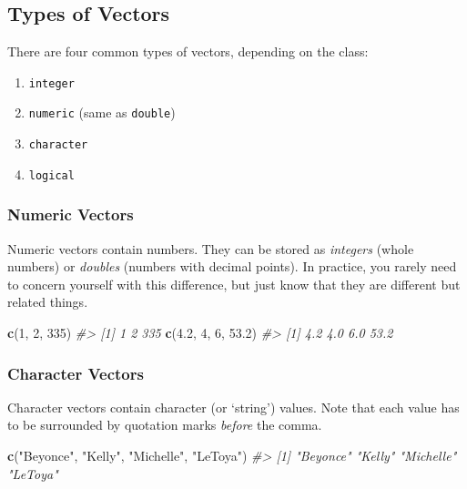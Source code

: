 \documentclass[]{book}
\newenvironment{Shaded}{\begin{snugshade}}{\end{snugshade}}
\newcommand{\KeywordTok}[1]{\textcolor[rgb]{0.13,0.29,0.53}{\textbf{#1}}}
\newcommand{\DecValTok}[1]{\textcolor[rgb]{0.00,0.00,0.81}{#1}}
\newcommand{\FloatTok}[1]{\textcolor[rgb]{0.00,0.00,0.81}{#1}}
\newcommand{\StringTok}[1]{\textcolor[rgb]{0.31,0.60,0.02}{#1}}
\newcommand{\CommentTok}[1]{\textcolor[rgb]{0.56,0.35,0.01}{\textit{#1}}}
\newcommand{\NormalTok}[1]{#1}
\providecommand{\tightlist}{%
  \setlength{\itemsep}{0pt}\setlength{\parskip}{0pt}}
\begin{document}
\subsection{Types of Vectors}\label{types-of-vectors}

There are four common types of vectors, depending on the class:

\begin{enumerate}
\def\labelenumi{\arabic{enumi}.}
\tightlist
\item
  \texttt{integer}
\item
  \texttt{numeric} (same as \texttt{double})
\item
  \texttt{character}
\item
  \texttt{logical}
\end{enumerate}

\subsubsection*{Numeric Vectors}\label{numeric-vectors}

Numeric vectors contain numbers. They can be stored as \emph{integers}
(whole numbers) or \emph{doubles} (numbers with decimal points). In
practice, you rarely need to concern yourself with this difference, but
just know that they are different but related things.

\begin{Shaded}
\begin{Highlighting}[]
\KeywordTok{c}\NormalTok{(}\DecValTok{1}\NormalTok{, }\DecValTok{2}\NormalTok{, }\DecValTok{335}\NormalTok{)}
\CommentTok{#> [1]   1   2 335}
\KeywordTok{c}\NormalTok{(}\FloatTok{4.2}\NormalTok{, }\DecValTok{4}\NormalTok{, }\DecValTok{6}\NormalTok{, }\FloatTok{53.2}\NormalTok{)}
\CommentTok{#> [1]  4.2  4.0  6.0 53.2}
\end{Highlighting}
\end{Shaded}

\subsubsection*{Character Vectors}\label{character-vectors}

Character vectors contain character (or `string') values. Note that each
value has to be surrounded by quotation marks \emph{before} the comma.

\begin{Shaded}
\begin{Highlighting}[]
\KeywordTok{c}\NormalTok{(}\StringTok{"Beyonce"}\NormalTok{, }\StringTok{"Kelly"}\NormalTok{, }\StringTok{"Michelle"}\NormalTok{, }\StringTok{"LeToya"}\NormalTok{)}
\CommentTok{#> [1] "Beyonce"  "Kelly"    "Michelle" "LeToya"}
\end{Highlighting}
\end{Shaded}
\end{document}
